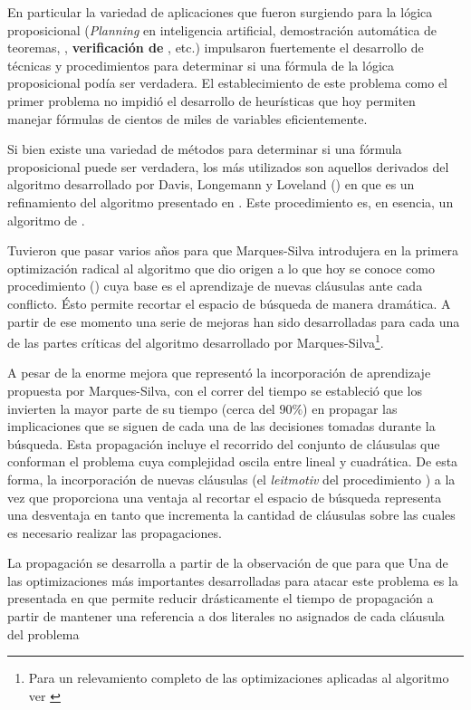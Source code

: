 En particular la variedad de aplicaciones que fueron surgiendo para la lógica
proposicional (\emph{Planning} en inteligencia artificial, demostración
automática de teoremas, \textbf{\mc}, \textbf{verificación de \soft}, etc.)
impulsaron fuertemente el desarrollo de técnicas y procedimientos para
determinar si una fórmula de la lógica proposicional podía ser verdadera. El
establecimiento de este problema como el primer problema \npc
\cite{Cook:1971:CTP:800157.805047} no impidió el desarrollo de heurísticas que
hoy permiten manejar fórmulas de cientos de miles de variables eficientemente.

Si bien existe una variedad de métodos para determinar si una fórmula
proposicional puede ser verdadera, los más utilizados son aquellos derivados
del algoritmo desarrollado por Davis, Longemann y Loveland (\dpll) en
\cite{Davis:1962:MPT:368273.368557} que es un refinamiento del algoritmo
presentado en \cite{Davis:1960:CPQ:321033.321034}. Este procedimiento es, en
esencia, un algoritmo de \bt.

Tuvieron que pasar varios años para que Marques-Silva introdujera en \cite
{marques-silva:iccad96} la primera optimización radical al algoritmo \dpll que
dio origen a lo que hoy se conoce como procedimiento \cdcl (\CDCL) cuya base
es el aprendizaje de nuevas cláusulas ante cada conflicto. Ésto permite
recortar el espacio de búsqueda de manera dramática. A partir de ese momento
una serie de mejoras han sido desarrolladas para cada una de las partes
críticas del algoritmo desarrollado por Marques-Silva\footnote{Para un
relevamiento completo de las optimizaciones aplicadas al algoritmo \CDCL ver
\cite{manthey:mathesis}}.

A pesar de la enorme mejora que representó la incorporación de aprendizaje
propuesta por Marques-Silva, con el correr del tiempo se estableció que los
\ssolvers invierten la mayor parte de su tiempo (cerca del $90\%$) en propagar
las implicaciones que se siguen de cada una de las decisiones tomadas durante
la búsqueda. Esta propagación incluye el recorrido del conjunto de cláusulas
que conforman el problema cuya complejidad oscila entre lineal y cuadrática.
De esta forma, la incorporación de nuevas cláusulas (el \emph{leitmotiv} del
procedimiento \CDCL) a la vez que proporciona una ventaja al recortar el
espacio de búsqueda representa una desventaja en tanto que incrementa la
cantidad de cláusulas sobre las cuales es necesario realizar las
propagaciones. 

La propagación se desarrolla a partir de la observación de que para que Una de las optimizaciones más importantes desarrolladas para
atacar este problema es la presentada en \cite{moskewicz:da01} que permite
reducir drásticamente el tiempo de propagación a partir de mantener una
referencia a dos literales no asignados de cada cláusula del problema

